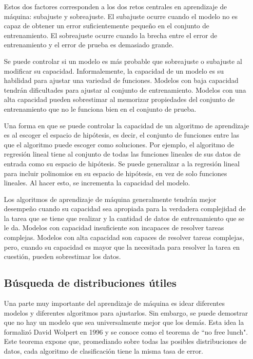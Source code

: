 Estos dos factores corresponden a los dos retos centrales en aprendizaje de máquina: subajuste y sobreajuste. El subajuste ocurre cuando el modelo no es capaz de obtener un error suficientemente pequeño en el conjunto de entrenamiento. El sobreajuste ocurre cuando la brecha entre el error de entrenamiento y el error de prueba es demasiado grande.

\vspace{1em}

Se puede controlar si un modelo es más probable que sobreajuste o subajuste al modificar su capacidad. Informalemente, la capacidad de un modelo es su habilidad para ajustar una variedad de funciones. Modelos con baja capacidad tendrán dificultades para ajustar al conjunto de entrenamiento. Modelos con una alta capacidad pueden sobrestimar al memorizar propiedades del conjunto de entrenamiento que no le funciona bien en el conjunto de prueba.
\cite{goodfellow-et-al-2016}

\vspace{1em}

Una forma en que se puede controlar la capacidad de un algoritmo de aprendizaje es al escoger el espacio de hipótesis, es decir, el conjunto de funciones entre las que el algoritmo puede escoger como soluciones. Por ejemplo, el algoritmo de regresión lineal tiene al conjunto de todas las funciones lineales de sus datos de entrada como su espacio de hipótesis. Se puede generalizar a la regresión lineal para incluir polinomios en su espacio de hipótesis, en vez de solo funciones lineales. Al hacer esto, se incrementa la capacidad del modelo.

\vspace{1em}

Los algoritmos de aprendizaje de máquina generalmente tendrán mejor desempeño cuando su capacidad sea apropiada para la verdadera complejidad de la tarea que se tiene que realizar y la cantidad de datos de entrenamiento que se le da. Modelos con capacidad insuficiente son incapaces de resolver tareas complejas. Modelos con alta capacidad son capaces de resolver tareas complejas, pero, cuando su capacidad es mayor que la necesitada para resolver la tarea en cuestión, pueden sobrestimar los datos.

\subsection{Búsqueda de distribuciones útiles}
Una parte muy importante del aprendizaje de máquina es idear diferentes modelos y diferentes algoritmos para ajustarlos. Sin embargo, se puede demostrar que no hay un modelo que sea universalmente mejor que los demás. Esta idea la formalizó David Wolpert en 1996 y se conoce como el teorema de ``no free lunch". Este teorema expone que, promediando sobre todas las posibles distribuciones de datos, cada algoritmo de clasificación tiene la misma tasa de error. 
\cite{Murphy:2012:MLP:2380985}
\cite{wolpert}


